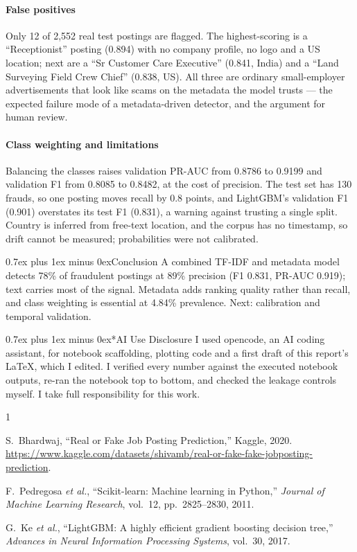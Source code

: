 \documentclass[10pt,journal,a4paper]{IEEEtran}
\makeatletter
\def\section{\@startsection{section}{1}{\z@}{3.0ex plus 1.5ex minus 1.5ex}%
{0.7ex plus 1ex minus 0ex}{\normalfont\normalsize\centering\bfseries}}%
\makeatother
\begin{document}
\paragraph{False positives}
Only 12 of 2,552 real test postings are flagged. The highest-scoring is a
``Receptionist'' posting (0.894) with no company profile, no logo and a US
location; next are a ``Sr Customer Care Executive'' (0.841, India) and a ``Land
Surveying Field Crew Chief'' (0.838, US). All three are ordinary small-employer
advertisements that look like scams on the metadata the model trusts --- the
expected failure mode of a metadata-driven detector, and the argument for human
review.

\paragraph{Class weighting and limitations}
Balancing the classes raises validation PR-AUC from 0.8786 to 0.9199 and
validation F1 from 0.8085 to 0.8482, at the cost of precision. The test set has
130 frauds, so one posting moves recall by 0.8 points, and LightGBM's validation
F1 (0.901) overstates its test F1 (0.831), a warning against trusting a single
split. Country is inferred from free-text location, and the corpus has no
timestamp, so drift cannot be measured; probabilities were not calibrated.

\section{Conclusion}
A combined TF-IDF and metadata model detects 78\% of fraudulent postings at 89\%
precision (F1 0.831, PR-AUC 0.919); text carries most of the signal. Metadata
adds ranking quality rather than recall, and class weighting is essential at
4.84\% prevalence. Next: calibration and temporal validation.

\section*{AI Use Disclosure}
I used opencode, an AI coding assistant, for notebook scaffolding, plotting code
and a first draft of this report's LaTeX, which I edited. I verified every
number against the executed notebook outputs, re-ran the notebook top to bottom,
and checked the leakage controls myself. I take full responsibility for this
work.

\begin{thebibliography}{1}
\raggedright
{} S.~Bhardwaj, ``Real or Fake Job Posting Prediction,''
Kaggle, 2020. \url{https://www.kaggle.com/datasets/shivamb/real-or-fake-fake-jobposting-prediction}.

 F.~Pedregosa \emph{et al.}, ``Scikit-learn: Machine learning
in Python,'' \emph{Journal of Machine Learning Research}, vol.~12,
pp.~2825--2830, 2011.

 G.~Ke \emph{et al.}, ``LightGBM: A highly efficient gradient
boosting decision tree,'' \emph{Advances in Neural Information Processing
Systems}, vol.~30, 2017.
\end{thebibliography}
\end{document}
